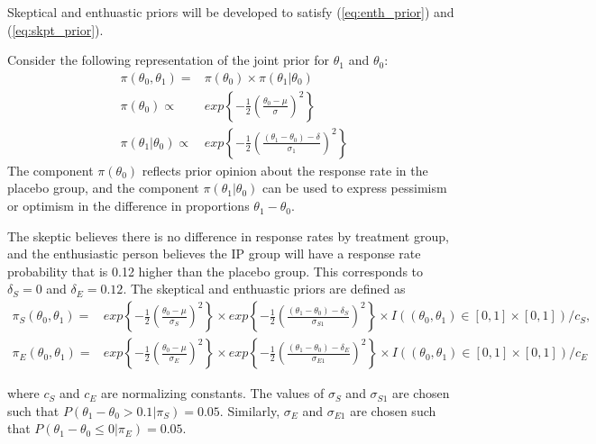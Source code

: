 \documentclass[12pt]{article}
\begin{document}
Skeptical and enthuastic priors will be developed to satisfy (\ref{eq:enth_prior}) and (\ref{eq:skpt_prior}).

Consider the following representation of the joint prior for $\theta_1$ and $\theta_0$:
\begin{align*}
\pi(\theta_0,\theta_1)=&\pi(\theta_0)\times\pi(\theta_1|\theta_0)\\
\pi(\theta_0)\propto&exp\left\{-\frac{1}{2}\left(\frac{\theta_0-\mu}{\sigma}\right)^{2}\right\}\\
\pi(\theta_1|\theta_0)\propto&exp\left\{-\frac{1}{2}\left(\frac{(\theta_1-\theta_0)-\delta}{\sigma_1}\right)^{2}\right\}
\end{align*}
The component $\pi(\theta_0)$ reflects prior opinion about the response rate in the placebo group, and the component $\pi(\theta_1|\theta_0)$ can be used to express pessimism or optimism in the difference in proportions $\theta_1 - \theta_0$. 

The skeptic believes there is no difference in response rates by treatment group, and the enthusiastic person believes the IP group will have a response rate probability that is 0.12 higher than the placebo group. This corresponds to $\delta_S=0$ and $\delta_E=0.12$. The skeptical and enthuastic priors are defined as
\begin{align*}
\pi_S(\theta_0,\theta_1)=&exp\left\{-\frac{1}{2}\left(\frac{\theta_0-\mu}{\sigma_S}\right)^{2}\right\}\times exp\left\{-\frac{1}{2}\left(\frac{(\theta_1-\theta_0)-\delta_S}{\sigma_{S1}}\right)^{2}\right\}\times I((\theta_0,\theta_1)\in [0,1]\times[0,1]) /c_S,\\
\pi_E(\theta_0,\theta_1)=&exp\left\{-\frac{1}{2}\left(\frac{\theta_0-\mu}{\sigma_E}\right)^{2}\right\}\times exp\left\{-\frac{1}{2}\left(\frac{(\theta_1-\theta_0)-\delta_E}{\sigma_{E1}}\right)^{2}\right\}\times I((\theta_0,\theta_1)\in [0,1]\times[0,1]) /c_E
\end{align*}

where $c_S$ and $c_E$ are normalizing constants. The values of $\sigma_S$ and $\sigma_{S1}$ are chosen such that $P(\theta_1-\theta_0>0.1|\pi_S)=0.05$. Similarly, $\sigma_E$ and $\sigma_{E1}$ are chosen such that $P(\theta_1-\theta_0\leq0|\pi_E)=0.05$.


\end{document}
